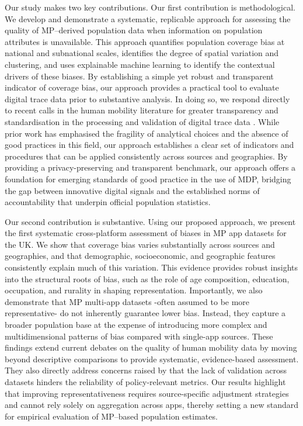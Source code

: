 \documentclass[]{rsos}%
\begin{document}
Our study makes two key contributions. Our first contribution is
methodological. We develop and demonstrate a systematic, replicable
approach for assessing the quality of MP--derived population data when
information on population attributes is unavailable. This approach
quantifies population coverage bias at national and subnational scales,
identifies the degree of spatial variation and clustering, and uses
explainable machine learning to identify the contextual drivers of these
biases. By establishing a simple yet robust and transparent indicator of
coverage bias, our approach provides a practical tool to evaluate
digital trace data prior to substantive analysis. In doing so, we
respond directly to recent calls in the human mobility literature for
greater transparency and standardisation in the processing and
validation of digital trace data \citep{barreras2024exciting, unstatsMPDMS2025, UKGovPopulationMovement2025}. While prior work has
emphasised the fragility of analytical choices and the absence of good
practices in this field, our approach establishes a clear set of
indicators and procedures that can be applied consistently across
sources and geographies. By providing a privacy-preserving and
transparent benchmark, our approach offers a foundation for emerging
standards of good practice in the use of MDP, bridging the gap between
innovative digital signals and the established norms of accountability
that underpin official population statistics.

Our second contribution is substantive. Using our proposed approach, we
present the first systematic cross-platform assessment of biases in MP
app datasets for the UK. We show that coverage bias varies substantially
across sources and geographies, and that demographic, socioeconomic, and
geographic features consistently explain much of this variation. This
evidence provides robust insights into the structural roots of bias,
such as the role of age composition, education, occupation, and rurality
in shaping representation. Importantly, we also demonstrate that MP
multi-app datasets -often assumed to be more representative- do not
inherently guarantee lower bias. Instead, they capture a broader
population base at the expense of introducing more complex and
multidimensional patterns of bias compared with single-app sources.
These findings extend current debates on the quality of human mobility
data by moving beyond descriptive comparisons to provide systematic,
evidence-based assessment. They also directly address concerns raised by
\citet{barreras2024exciting} that the lack of validation across datasets
hinders the reliability of policy-relevant metrics. Our results
highlight that improving representativeness requires source-specific
adjustment strategies and cannot rely solely on aggregation across apps,
thereby setting a new standard for empirical evaluation of MP--based
population estimates.
\end{document}
